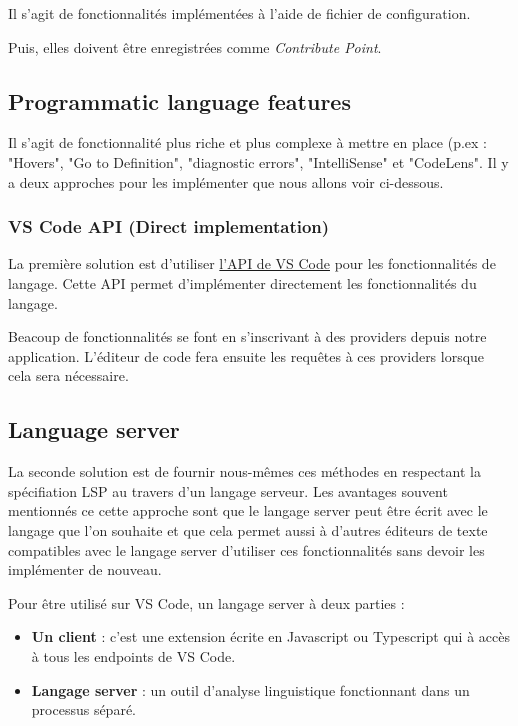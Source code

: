 \documentclass[
    iict, %
    il, %
]{heig-tb}
\begin{document}
Il s'agit de fonctionnalités implémentées à l'aide de fichier de configuration.

Puis, elles doivent être enregistrées comme \emph{Contribute Point}.

\subsection{Programmatic language features}\label{Programmatic language features}
Il s'agit de fonctionnalité plus riche et plus complexe à mettre en place (p.ex : "Hovers", "Go to Definition", "diagnostic errors", "IntelliSense" \space et "CodeLens".
Il y a deux approches pour les implémenter que nous allons voir ci-dessous.

\subsubsection{VS Code API (Direct implementation)}
La première solution est d'utiliser \href{https://code.visualstudio.com/api/references/vscode-api#languages}{l'API de VS Code} pour les fonctionnalités de langage.
Cette API permet d'implémenter directement les fonctionnalités du langage.

Beacoup de fonctionnalités se font en s'inscrivant à des providers depuis notre application.
L'éditeur de code fera ensuite les requêtes à ces providers lorsque cela sera nécessaire.

\subsection{Language server}

La seconde solution est de fournir nous-mêmes ces méthodes en respectant la spécifiation LSP \cite{lsp-specification} au travers d'un langage serveur.
Les avantages souvent mentionnés ce cette approche sont que le langage server peut être écrit avec le langage que l'on souhaite et
que cela permet aussi à d'autres éditeurs de texte compatibles avec le langage server d'utiliser ces fonctionnalités sans devoir les implémenter de nouveau.

Pour être utilisé sur VS Code, un langage server à deux parties :
\begin{itemize}
    \item \textbf{Un client} : c'est une extension écrite en Javascript ou Typescript qui à accès à tous les endpoints de VS Code.
    \item \textbf{Langage server} : un outil d'analyse linguistique fonctionnant dans un processus séparé.
\end{itemize}
\end{document}
